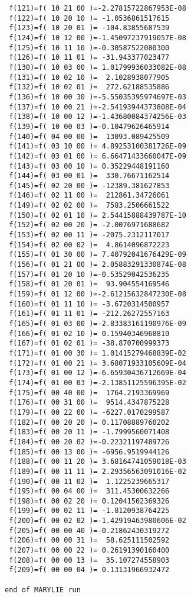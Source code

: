 \begin{footnotesize}
\begin{verbatim}
 f(121)=f( 10 21 00 )=-2.27815722867953E-08
 f(122)=f( 10 20 10 )= -1.0536861517615
 f(123)=f( 10 20 01 )= -104.83855687539
 f(124)=f( 10 12 00 )=-1.45097237919057E-08
 f(125)=f( 10 11 10 )=-0.30587522080300
 f(126)=f( 10 11 01 )= -31.943377023477
 f(130)=f( 10 03 00 )= 1.01799936033082E-08
 f(131)=f( 10 02 10 )=  2.1028938077905
 f(132)=f( 10 02 01 )=  272.62188535886
 f(136)=f( 10 00 30 )=-5.55035395974697E-03
 f(137)=f( 10 00 21 )=-2.54193944373808E-04
 f(138)=f( 10 00 12 )=-1.43680084374256E-03
 f(139)=f( 10 00 03 )=-0.10479626465914
 f(140)=f( 04 00 00 )=  13093.089425509
 f(141)=f( 03 10 00 )= 4.89253100381726E-09
 f(142)=f( 03 01 00 )= 6.66471433660047E-09
 f(143)=f( 03 00 10 )= 0.35229448191160
 f(144)=f( 03 00 01 )=  330.76671162514
 f(145)=f( 02 20 00 )= -12389.381627853
 f(146)=f( 02 11 00 )=  212861.34726061
 f(149)=f( 02 02 00 )=  7583.2506661522
 f(150)=f( 02 01 10 )= 2.54415888439787E-10
 f(152)=f( 02 00 20 )= -2.0076971688682
 f(153)=f( 02 00 11 )= -2075.2312117017
 f(154)=f( 02 00 02 )=  4.8614096872223
 f(155)=f( 01 30 00 )= 7.40792041676429E-09
 f(156)=f( 01 21 00 )= 2.05883291330874E-08
 f(157)=f( 01 20 10 )=-0.53529042536235
 f(158)=f( 01 20 01 )=  93.904554169546
 f(159)=f( 01 12 00 )=-2.61215632847230E-08
 f(160)=f( 01 11 10 )= -3.6720314500957
 f(161)=f( 01 11 01 )= -212.26272557163
 f(165)=f( 01 03 00 )=-2.83383161190976E-09
 f(166)=f( 01 02 10 )= 0.15940346968810
 f(167)=f( 01 02 01 )= -38.870700999373
 f(171)=f( 01 00 30 )= 1.01415279468839E-02
 f(172)=f( 01 00 21 )= 3.68071933105609E-04
 f(173)=f( 01 00 12 )=-6.65930436712669E-04
 f(174)=f( 01 00 03 )=-2.13851125596395E-02
 f(175)=f( 00 40 00 )=  1764.2193369969
 f(176)=f( 00 31 00 )=  9514.4347875228
 f(179)=f( 00 22 00 )= -6227.0170299587
 f(182)=f( 00 20 20 )= 0.11708889760202
 f(183)=f( 00 20 11 )= -1.7999560071408
 f(184)=f( 00 20 02 )=-0.22321197489726
 f(185)=f( 00 13 00 )= -6956.9519944126
 f(188)=f( 00 11 20 )= 3.68164741059018E-03
 f(189)=f( 00 11 11 )= 2.29356563091016E-02
 f(190)=f( 00 11 02 )=  1.1225239665317
 f(195)=f( 00 04 00 )=  311.45300632266
 f(198)=f( 00 02 20 )= 0.12041502369326
 f(199)=f( 00 02 11 )= -1.8120938764225
 f(200)=f( 00 02 02 )=-1.42919463980606E-02
 f(205)=f( 00 00 40 )=-0.21862430319272
 f(206)=f( 00 00 31 )=  58.625111502592
 f(207)=f( 00 00 22 )= 0.26191390160400
 f(208)=f( 00 00 13 )=  35.107274558903
 f(209)=f( 00 00 04 )= 0.13131966932472

end of MARYLIE run
\end{verbatim}
\end{footnotesize}

